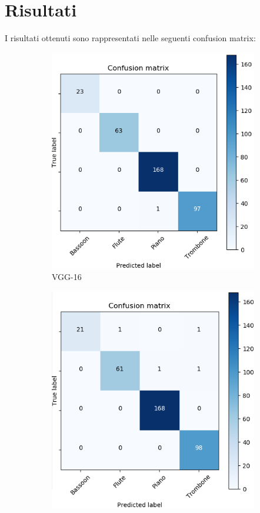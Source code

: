 \documentclass{article}
\begin{document}
\section{Risultati}
I risultati ottenuti sono rappresentati nelle seguenti confusion matrix:

\begin{figure}[h]
    \centering
    \begin{subfigure}{.5\textwidth}
      \centering
      \includegraphics[scale=0.5]{immagini/vgg16_confusion_matrix.png}
      \caption{VGG-16}
    \end{subfigure}%
    \begin{subfigure}{.5\textwidth}
      \centering
      \includegraphics[scale=0.5]{immagini/incv3_confusion_matrix.png}

\end{subfigure}
\end{figure}
\end{document}
